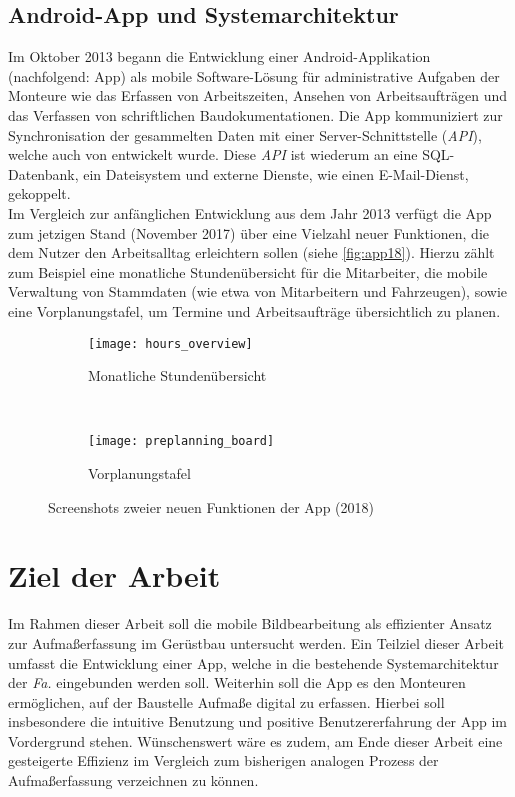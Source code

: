 \subsection{Android-App und Systemarchitektur}
Im Oktober 2013 begann die Entwicklung einer Android-Applikation (nachfolgend: App) als mobile Software-Lösung für administrative Aufgaben der Monteure wie das Erfassen von Arbeitszeiten, Ansehen von Arbeitsaufträgen und das Verfassen von schriftlichen Baudokumentationen.
Die App kommuniziert zur Synchronisation der gesammelten Daten mit einer Server-Schnittstelle (\emph{API}), welche auch von \vr{} entwickelt wurde.
Diese \emph{API} ist wiederum an eine SQL-Datenbank, ein Dateisystem und externe Dienste, wie einen E-Mail-Dienst, gekoppelt. \\

Im Vergleich zur anfänglichen Entwicklung aus dem Jahr 2013 verfügt die App zum jetzigen Stand (November 2017) über eine Vielzahl neuer Funktionen, die dem Nutzer den Arbeitsalltag erleichtern sollen (siehe \autoref{fig:app18}).
Hierzu zählt zum Beispiel eine monatliche Stundenübersicht für die Mitarbeiter, die mobile Verwaltung von Stammdaten (wie etwa von Mitarbeitern und Fahrzeugen), sowie eine Vorplanungstafel, um Termine und Arbeitsaufträge übersichtlich zu planen. 
\begin{figure}[h]
  \begin{subfigure}[t]{0.4\textwidth}
    \centering
    \texttt{[image: hours\_overview]}
    \caption{Monatliche Stundenübersicht}
  \end{subfigure}
  ~
  \begin{subfigure}[t]{0.4\textwidth}
    \centering
    \texttt{[image: preplanning\_board]}
    \caption{Vorplanungstafel}
  \end{subfigure}
  \centering
  \caption{Screenshots zweier neuen Funktionen der App (2018)}
  \label{fig:app18}
\end{figure}

\section{Ziel der Arbeit}
Im Rahmen dieser Arbeit soll die mobile Bildbearbeitung als effizienter Ansatz zur Aufmaßerfassung im Gerüstbau untersucht werden.
Ein Teilziel dieser Arbeit umfasst die Entwicklung einer App, welche in die bestehende Systemarchitektur der \emph{Fa.} \vr{} eingebunden werden soll.
Weiterhin soll die App es den Monteuren ermöglichen, auf der Baustelle Aufmaße digital zu erfassen.
Hierbei soll insbesondere die intuitive Benutzung und positive Benutzererfahrung der App im Vordergrund stehen.
Wünschenswert wäre es zudem, am Ende dieser Arbeit eine gesteigerte Effizienz im Vergleich zum bisherigen analogen Prozess der Aufmaßerfassung verzeichnen zu können.

